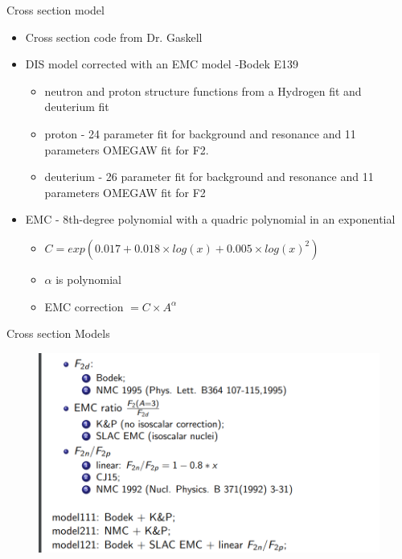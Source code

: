 \documentclass[12pt,usenames,dvipsnames]{beamer}
\begin{document}
\begin{frame}{Cross section model}
\begin{itemize}
	\item Cross section code from Dr. Gaskell

	\item DIS model corrected with an EMC model -Bodek E139
	\begin{itemize}
		\item neutron and proton structure functions from a Hydrogen fit and deuterium fit
		\item proton - 24 parameter fit for background and resonance and 11 parameters OMEGAW fit for F2.
		\item deuterium - 26 parameter fit for background and resonance and 11 parameters OMEGAW fit for F2
	\end{itemize}
	\item EMC - 8th-degree polynomial  with a quadric polynomial in an exponential
	\begin{itemize}
		\item $C = exp( 0.017 + 0.018 \times log(x) + 0.005 \times log(x)^2)$
		\item $\alpha$ is polynomial
		\item EMC correction $= C \times A^{\alpha}$
	\end{itemize}
\end{itemize}
\end{frame}

\begin{frame}{Cross section Models}
\vspace{-1.cm}
\begin{figure}
\includegraphics[width=12cm]{../images/models.png}
\end{figure}
\end{frame}
\end{document}
